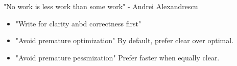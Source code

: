 "No work is less work than some work" - Andrei Alexandrescu

\begin{itemize}
    \item "Write for clarity anbd correctness first"
    \item "Avoid premature optimization" By default, prefer clear over optimal.
    \item "Avoid premature pessmization" Prefer faster when equally clear.
\end{itemize}